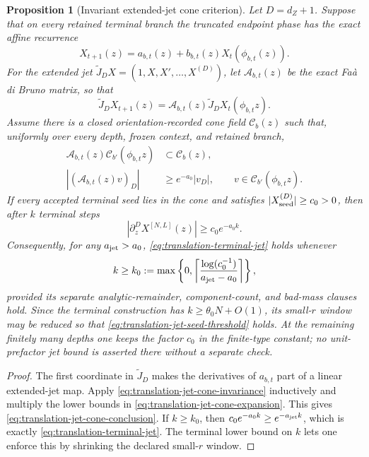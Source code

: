 \documentclass[11pt]{article}
\newtheorem{proposition}[theorem]{Proposition}
\begin{document}
\begin{proposition}[Invariant extended-jet cone criterion]
\label{prop:translation-terminal-jet-cone}
Let $D=d_Z+1$.  Suppose that on every retained terminal branch the truncated
endpoint phase has the exact affine recurrence
\begin{equation}
\label{eq:translation-affine-jet-recurrence}
 X_{t+1}(z)=a_{b,t}(z)+b_{b,t}(z)
                 X_t(\phi_{b,t}(z)).
\end{equation}
For the extended jet
$\widetilde J_DX=(1,X,X',\ldots,X^{(D)})$, let
$\mathcal A_{b,t}(z)$ be the exact Fa\`a di Bruno matrix, so that
\begin{equation}
\label{eq:translation-extended-jet-cocycle}
 \widetilde J_DX_{t+1}(z)
 =\mathcal A_{b,t}(z)
  \widetilde J_DX_t(\phi_{b,t}z).
\end{equation}
Assume there is a closed orientation-recorded cone field $\mathscr C_b(z)$
such that, uniformly over every depth, frozen context, and retained branch,
\begin{align}
 \mathcal A_{b,t}(z)\mathscr C_{b'}(\phi_{b,t}z)
 &\subset\mathscr C_b(z),
 \label{eq:translation-jet-cone-invariance}\\
 |(\mathcal A_{b,t}(z)v)_D|
 &\ge e^{-a_0}|v_D|,
 \qquad v\in\mathscr C_{b'}(\phi_{b,t}z).
 \label{eq:translation-jet-cone-expansion}
\end{align}
If every accepted terminal seed lies in the cone and satisfies
$|X_{\rm seed}^{(D)}|\ge c_0>0$, then after $k$ terminal steps
\begin{equation}
\label{eq:translation-jet-cone-conclusion}
 |\partial_z^DX^{[N,L]}(z)|\ge c_0e^{-a_0k}.
\end{equation}
Consequently, for any $a_{\rm jet}>a_0$,
\eqref{eq:translation-terminal-jet} holds whenever
\begin{equation}
\label{eq:translation-jet-seed-threshold}
 k\ge k_0:=\max\left\{0,
 \left\lceil\frac{\log(c_0^{-1})}{a_{\rm jet}-a_0}\right\rceil\right\},
\end{equation}
provided its separate analytic-remainder, component-count, and bad-mass
clauses hold.  Since the terminal construction has
$k\ge\theta_0N+O(1)$, its small-$r$ window may be reduced so that
\eqref{eq:translation-jet-seed-threshold} holds.  At the remaining finitely
many depths one keeps the factor $c_0$ in the finite-type constant; no
unit-prefactor jet bound is asserted there without a separate check.
\end{proposition}

\begin{proof}
The first coordinate in $\widetilde J_D$ makes the derivatives of
$a_{b,t}$ part of a linear extended-jet map.  Apply
\eqref{eq:translation-jet-cone-invariance} inductively and multiply the
lower bounds in \eqref{eq:translation-jet-cone-expansion}.  This gives
\eqref{eq:translation-jet-cone-conclusion}.  If
$k\ge k_0$, then $c_0e^{-a_0k}\ge e^{-a_{\rm jet}k}$, which is exactly
\eqref{eq:translation-terminal-jet}.  The terminal lower bound on $k$ lets
one enforce this by shrinking the declared small-$r$ window.
\end{proof}
\end{document}
